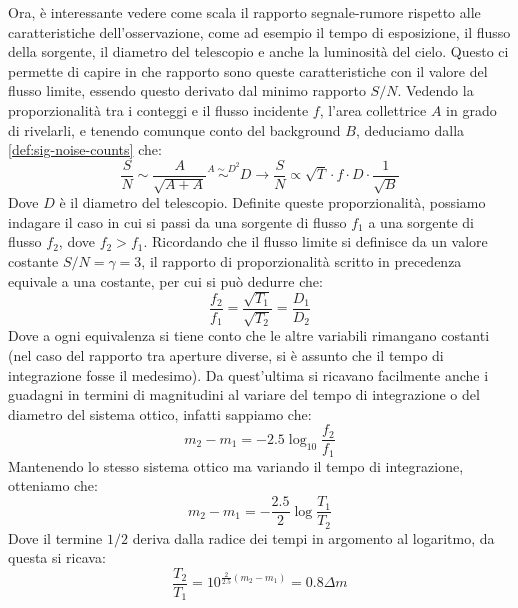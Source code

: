 Ora, è interessante vedere come scala il rapporto segnale-rumore rispetto alle caratteristiche dell'osservazione, come ad esempio il tempo di esposizione, il flusso della sorgente, il diametro del telescopio e anche la luminosità del cielo. Questo ci permette di capire in che rapporto sono queste caratteristiche con il valore del flusso limite, essendo questo derivato dal minimo rapporto $S/N$. Vedendo la proporzionalità tra i conteggi e il flusso incidente $f$, l'area collettrice $A$ in grado di rivelarli, e tenendo comunque conto del background $B$, deduciamo dalla \ref{def:sig-noise-counts} che:
\begin{equation}
	\label{eq:sig-noise-prop}
	\frac{S}{N} \sim \frac{A}{\sqrt{A+A}} \overset{A \sim D^2}{\sim} D \longrightarrow
	\frac{S}{N} \propto \sqrt{T} \cdot f \cdot D \cdot \frac{1}{\sqrt{B}}
\end{equation}
Dove $D$ è il diametro del telescopio. Definite queste proporzionalità, possiamo indagare il caso in cui si passi da una sorgente di flusso $f_1$ a una sorgente di flusso $f_2$, dove $f_2>f_1$. Ricordando che il flusso limite si definisce da un valore costante $S/N=\gamma=3$, il rapporto di proporzionalità scritto in precedenza equivale a una costante, per cui si può dedurre che:
\begin{equation*}
	\frac{f_2}{f_1}=\frac{\sqrt{T_1}}{\sqrt{T_2}} = \frac{D_1}{D_2}
\end{equation*}
Dove a ogni equivalenza si tiene conto che le altre variabili rimangano costanti (nel caso del rapporto tra aperture diverse, si è assunto che il tempo di integrazione fosse il medesimo). Da quest'ultima si ricavano facilmente anche i guadagni in termini di magnitudini al variare del tempo di integrazione o del diametro del sistema ottico, infatti sappiamo che:
\begin{equation*}
	m_2-m_1 = -2.5\log_{10}\frac{f_2}{f_1}
\end{equation*}
Mantenendo lo stesso sistema ottico ma variando il tempo di integrazione, otteniamo che:
\begin{equation*}
	m_2-m_1 = -\frac{2.5}{2}\log\frac{T_1}{T_2}
\end{equation*}
Dove il termine $1/2$ deriva dalla radice dei tempi in argomento al logaritmo, da questa si ricava:
\begin{equation}
	\label{eq:lim-flux-mag-var-T}
	\frac{T_2}{T_1} = 10^{\frac{2}{2.5}(m_2-m_1)} = 0.8\Delta m
\end{equation}
